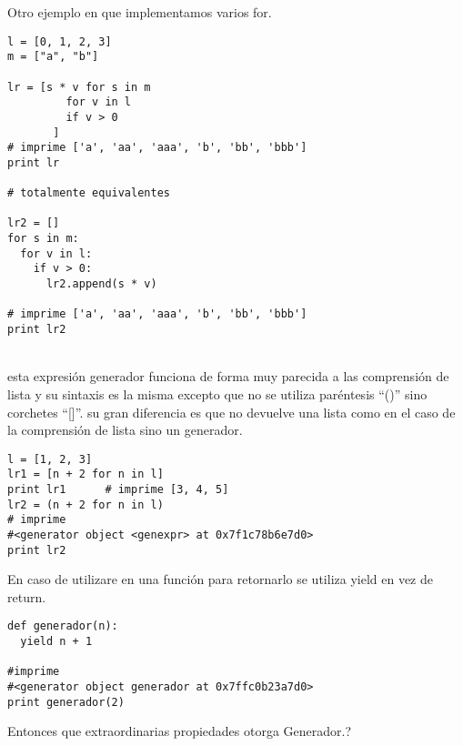 \begin{multicols}{2}

Otro ejemplo en que implementamos varios for.\\

\lstset{language=Python,frame=tb,framesep=5pt,basicstyle=\footnotesize}   
\begin{lstlisting}
l = [0, 1, 2, 3]
m = ["a", "b"]

lr = [s * v for s in m
	     for v in l
	     if v > 0
       ]
# imprime ['a', 'aa', 'aaa', 'b', 'bb', 'bbb']
print lr 

# totalmente equivalentes

lr2 = []
for s in m:
  for v in l:
    if v > 0:
      lr2.append(s * v)
      
# imprime ['a', 'aa', 'aaa', 'b', 'bb', 'bbb']
print lr2 
\end{lstlisting}


\\ %
esta expresión generador  funciona de forma muy parecida a las comprensión de lista y su sintaxis es la misma excepto que no se utiliza
paréntesis ``()'' sino corchetes ``[]''. su gran diferencia es que no devuelve una lista como en el caso de la comprensión de lista  sino 
un generador.\\

\lstset{language=Python,frame=tb,framesep=5pt,basicstyle=\footnotesize}   
\begin{lstlisting}
l = [1, 2, 3]
lr1 = [n + 2 for n in l]
print lr1	   # imprime [3, 4, 5]
lr2 = (n + 2 for n in l)
# imprime 
#<generator object <genexpr> at 0x7f1c78b6e7d0>
print lr2	
\end{lstlisting}

En caso de utilizare en una función para retornarlo se utiliza yield en vez de return.\\

\lstset{language=Python,frame=tb,framesep=5pt,basicstyle=\footnotesize}   
\begin{lstlisting}
def generador(n):
  yield n + 1
  
#imprime 
#<generator object generador at 0x7ffc0b23a7d0>
print generador(2)           
\end{lstlisting}

Entonces que extraordinarias propiedades otorga Generador.?\\


\end{multicols}
